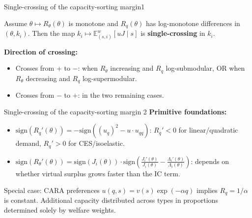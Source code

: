 \documentclass[10pt, aspectratio=169]{beamer}
\newcommand{\E}{\mathbb{E}}
\newcommand{\sign}{\mathrm{sign}}
\begin{document}
\begin{frame}{Single-crossing of the capacity-sorting margin1}
\begin{lemma}
Assume $\theta \mapsto R_\theta(\theta)$ is monotone and $R_q(\theta)$ has log-monotone differences in $(\theta, k_i)$. Then the map $k_i \mapsto \E_{(s,i)}^w[uJ \mid s]$ is \textbf{single-crossing} in $k_i$.
\end{lemma}
\vspace{0.2cm}
\textbf{Direction of crossing:}
\begin{itemize}
\item Crosses from $+$ to $-$: when $R_\theta$ increasing and $R_q$ log-submodular, OR when $R_\theta$ decreasing and $R_q$ log-supermodular.
\item Crosses from $-$ to $+$: in the two remaining cases.
\end{itemize}
\end{frame}
\begin{frame}{Single-crossing of the capacity-sorting margin 2}
\textbf{Primitive foundations:}
\begin{itemize}
\item $\sign(R_q'(\theta)) = -\sign\!\left((u_q)^2 - u\cdot u_{qq}\right)$: $R_q' < 0$ for linear/quadratic demand, $R_q' > 0$ for CES/isoelastic.
\item $\sign(R_\theta'(\theta)) = \sign(J_i(\theta))\cdot\sign\!\left(\frac{J_i'(\theta)}{J_i(\theta)} - \frac{\Lambda_i'(\theta)}{\Lambda_i(\theta)}\right)$: depends on whether virtual surplus grows faster than the IC term.
\end{itemize}
\vspace{0.2cm}
\begin{block}{Special case: CARA preferences}
$u(q,s) = v(s)\exp(-\alpha q)$ implies $R_q = 1/\alpha$ is constant. Additional capacity distributed across types in proportions determined solely by welfare weights.
\end{block}
\end{frame}
\end{document}
